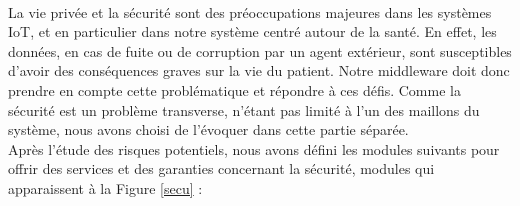 \paragraph{}
La vie privée et la sécurité sont des préoccupations majeures dans les systèmes IoT, et en particulier dans notre système centré autour de la santé. En effet, les données, en cas de fuite ou de corruption par un agent extérieur, sont susceptibles d'avoir des conséquences graves sur la vie du patient. Notre middleware doit donc prendre en compte cette problématique et répondre à ces défis. Comme la sécurité est un problème transverse, n'étant pas limité à l'un des maillons du système, nous avons choisi de l'évoquer dans cette partie séparée. \\Après l'étude des risques potentiels, nous avons défini les modules suivants pour offrir des services et des garanties concernant la sécurité, modules qui apparaissent à la Figure \ref{secu} :\\

